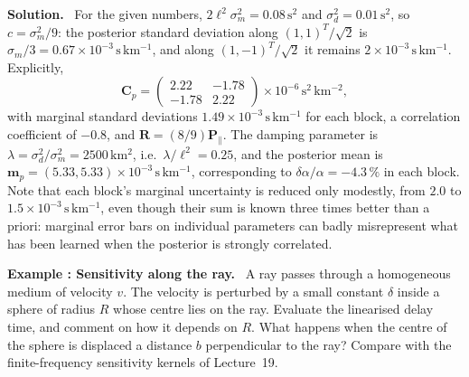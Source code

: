 \documentclass[a4paper,12pt]{paper}
\newcounter{example}
\renewenvironment{example}[1]{%
  \refstepcounter{example}%
  \begin{mdframed}[linewidth=1pt,innertopmargin=6pt,innerbottommargin=6pt]%
  \noindent\textbf{Example \theexample: #1.}\ }{%
  \end{mdframed}}
\newenvironment{solution}{\par\noindent\textbf{Solution.}\ }{\par\medskip}
\begin{document}
\begin{solution}
For the given numbers, $2\ell^{2}\sigma_{m}^{2} = 0.08\,\mathrm{s^{2}}$ and $\sigma_{d}^{2}=0.01\,\mathrm{s^{2}}$,
so $c=\sigma_{m}^{2}/9$: the posterior standard deviation along $(1,1)^{T}/\sqrt{2}$ is
$\sigma_{m}/3 = 0.67\times10^{-3}\,\mathrm{s\,km^{-1}}$, and along $(1,-1)^{T}/\sqrt{2}$ it remains
$2\times10^{-3}\,\mathrm{s\,km^{-1}}$. Explicitly,
\begin{equation}
    \mathbf{C}_{p} = \begin{pmatrix} 2.22 & -1.78 \\ -1.78 & 2.22 \end{pmatrix}\times10^{-6}\,\mathrm{s^{2}\,km^{-2}},
    \label{eq:33}
\end{equation}
with marginal standard deviations $1.49\times10^{-3}\,\mathrm{s\,km^{-1}}$ for each block, a
correlation coefficient of $-0.8$, and $\mathbf{R} = (8/9)\mathbf{P}_{\parallel}$. The damping parameter
is $\lambda = \sigma_{d}^{2}/\sigma_{m}^{2} = 2500\,\mathrm{km^{2}}$, i.e.\ $\lambda/\ell^{2}=0.25$, and
the posterior mean is $\mathbf{m}_{p} = (5.33, 5.33)\times10^{-3}\,\mathrm{s\,km^{-1}}$, corresponding to
$\delta\alpha/\alpha=-4.3\,\%$ in each block. Note that each block's marginal uncertainty is reduced
only modestly, from $2.0$ to $1.5\times10^{-3}\,\mathrm{s\,km^{-1}}$, even though their sum is known
three times better than a priori: marginal error bars on individual parameters can badly
misrepresent what has been learned when the posterior is strongly correlated.
\end{solution}

\begin{example}{Sensitivity along the ray}
A ray passes through a homogeneous medium of velocity $v$. The velocity is perturbed by a small
constant $\delta$ inside a sphere of radius $R$ whose centre lies on the ray. Evaluate the
linearised delay time, and comment on how it depends on $R$. What happens when the centre of the
sphere is displaced a distance $b$ perpendicular to the ray? Compare with the finite-frequency
sensitivity kernels of Lecture~19.
\end{example}
\end{document}
